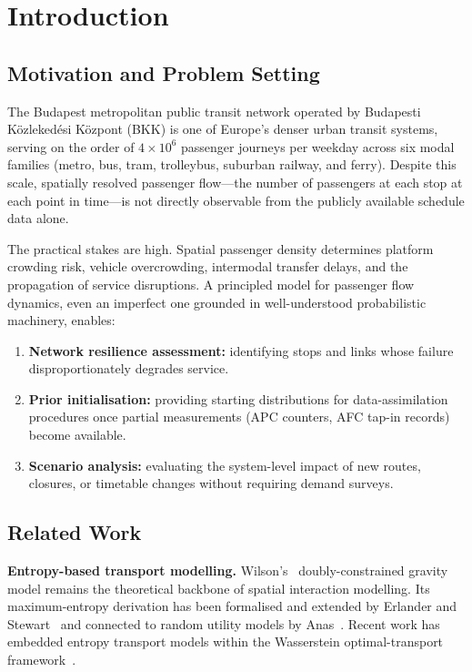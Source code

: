 \documentclass[11pt,a4paper]{article}
\theoremstyle{plain}
\theoremstyle{definition}
\theoremstyle{remark}
\begin{document}
\tableofcontents
\newpage

\section{Introduction}
\label{sec:intro}

\subsection{Motivation and Problem Setting}

The Budapest metropolitan public transit network operated by Budapesti
K\"{o}zleked\'{e}si K\"{o}zpont (BKK) is one of Europe's denser urban transit
systems, serving on the order of $4\times10^6$ passenger journeys per weekday
across six modal families (metro, bus, tram, trolleybus, suburban railway, and
ferry).  Despite this scale, spatially resolved passenger flow---the number of
passengers at each stop at each point in time---is not directly observable from
the publicly available schedule data alone.

The practical stakes are high.  Spatial passenger density determines platform
crowding risk, vehicle overcrowding, intermodal transfer delays, and the
propagation of service disruptions.  A principled model for passenger flow
dynamics, even an imperfect one grounded in well-understood probabilistic
machinery, enables:
\begin{enumerate}
  \item \textbf{Network resilience assessment:} identifying stops and links
    whose failure disproportionately degrades service.
  \item \textbf{Prior initialisation:} providing starting distributions for
    data-assimilation procedures once partial measurements (APC counters, AFC
    tap-in records) become available.
  \item \textbf{Scenario analysis:} evaluating the system-level impact of new
    routes, closures, or timetable changes without requiring demand surveys.
\end{enumerate}

\subsection{Related Work}

\textbf{Entropy-based transport modelling.}
Wilson's~\cite{wilson1969} doubly-constrained gravity model remains the
theoretical backbone of spatial interaction modelling.  Its maximum-entropy
derivation has been formalised and extended by Erlander and
Stewart~\cite{erlander1990} and connected to random utility models by
Anas~\cite{anas1983}.  Recent work has embedded entropy transport models within
the Wasserstein optimal-transport framework~\cite{peyre2019}.
\end{document}
